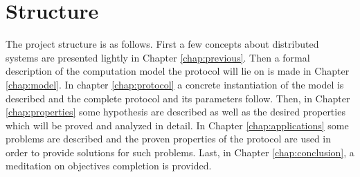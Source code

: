 \documentclass[..]{subfiles}
\begin{document}
\section{Structure}

The project structure is as follows. First a few concepts about distributed systems are presented lightly in Chapter \ref{chap:previous}. Then a formal description of the computation model the protocol will lie on is made in Chapter \ref{chap:model}. In chapter \ref{chap:protocol} a concrete instantiation of the model is described and the complete protocol and its parameters follow. Then, in Chapter \ref{chap:properties} some hypothesis are described as well as the desired properties which will be proved and analyzed in detail. In Chapter \ref{chap:applications} some problems are described and the proven properties of the protocol are used in order to provide solutions for such problems. Last, in Chapter \ref{chap:conclusion}, a meditation on objectives completion is provided.
\end{document}
